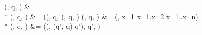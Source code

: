 \importLoads(, q, \varepsilon) &=  \\*
\importLoads(, q, \iota \cons \seq{\iota}) &= \importLoads(\importLoads(, q, \iota), q, \seq{\iota}) \clausegap
\importLoads(, q, ) &= \loads(, x_1 \cons x_1.x_2 \cons \cdots \cons x_1.\cdots.x_n) \\*
\importLoads(, q, ) &= \submodLoads(\loads(, \uniqueTo(q', q) \cons q'), q', )
